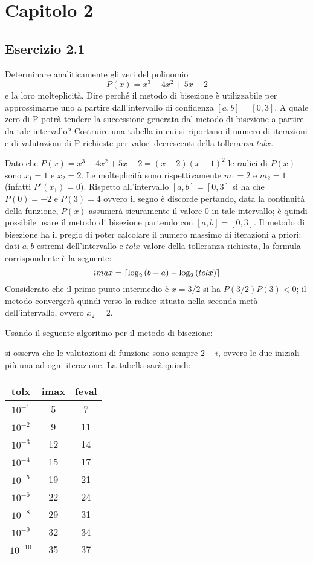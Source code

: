 \section{Capitolo 2}


	\subsection{Esercizio 2.1}

Determinare analiticamente gli zeri del polinomio 
\begin{equation*}
	P(x) = x^3 - 4x^2 + 5x - 2
\end{equation*}
 e la loro molteplicità. Dire perché il metodo di bisezione è utilizzabile per approssimarne uno a partire dall’intervallo di confidenza $[a,b]=[0,3]$. A quale zero di P potrà tendere la successione generata dal metodo di bisezione a partire da tale intervallo? Costruire una tabella in cui si riportano il numero di iterazioni e di valutazioni di P richieste per valori decrescenti della tolleranza $tolx$.

Dato che $P(x) = x^3 - 4x^2 + 5x - 2 = (x-2)(x-1)^2$ le radici di $P(x)$ sono $x_1=1$ e $x_2=2$. Le molteplicità sono rispettivamente $m_1=2$ e $m_2=1$ (infatti $P'(x_1) = 0$). Rispetto all'intervallo $[a,b]=[0,3]$ si ha che $P(0) = -2$ e $P(3)=4$ ovvero il segno è discorde pertando, data la continuità della funzione, $P(x)$ assumerà sicuramente il valore $0$ in tale intervallo; è quindi possibile usare il metodo di bisezione partendo con $[a,b] = [0,3].$
Il metodo di bisezione ha il pregio di poter calcolare il numero massimo di iterazioni a priori; dati $a,b$ estremi dell'intervallo e $tolx$ valore della tolleranza richiesta, la formula corrispondente è la seguente:
\begin{equation*}
	imax= \lceil\log_2{(b-a)}-\log_2{(tolx)}\rceil
\end{equation*}
Considerato che il primo punto intermedio è $x=3/2$ si ha $P(3/2)P(3)<0$; il metodo convergerà quindi verso la radice situata nella seconda metà dell'intervallo, ovvero $x_2=2$.

Usando il seguente algoritmo per il metodo di bisezione:

si osserva che le valutazioni di funzione sono sempre $2+i$, ovvero le due iniziali più una ad ogni iterazione. La tabella sarà quindi:

\begin{tabular}{ | c | c | c | }
\hline
\textbf{tolx} & \textbf{imax} & \textbf{feval} \\
\hline
$10^{-1}$ & 5 & 7 \\
$10^{-2}$ & 9 & 11 \\
$10^{-3}$ & 12 & 14 \\
$10^{-4}$ & 15 & 17 \\
$10^{-5}$ & 19 & 21 \\
$10^{-6}$ & 22 & 24 \\
$10^{-8}$ & 29 & 31 \\
$10^{-9}$ & 32 & 34 \\
$10^{-10}$ & 35 & 37 \\
\hline
\end{tabular}


